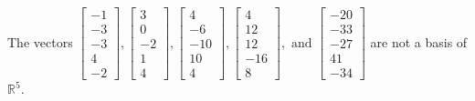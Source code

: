 \begin{exercise}
\begin{exerciseStatement}
  \end{exerciseStatement}
  \begin{exerciseAnswer}
   The vectors \(\left[\begin{array}{r}
-1 \\
-3 \\
-3 \\
4 \\
-2
\end{array}\right] , \left[\begin{array}{r}
3 \\
0 \\
-2 \\
1 \\
4
\end{array}\right] , \left[\begin{array}{r}
4 \\
-6 \\
-10 \\
10 \\
4
\end{array}\right] , \left[\begin{array}{r}
4 \\
12 \\
12 \\
-16 \\
8
\end{array}\right] , \text{ and } \left[\begin{array}{r}
-20 \\
-33 \\
-27 \\
41 \\
-34
\end{array}\right]\) 
  	 are not  a basis of \(\mathbb{R}^5\).
  


  \end{exerciseAnswer}
\end{exercise}